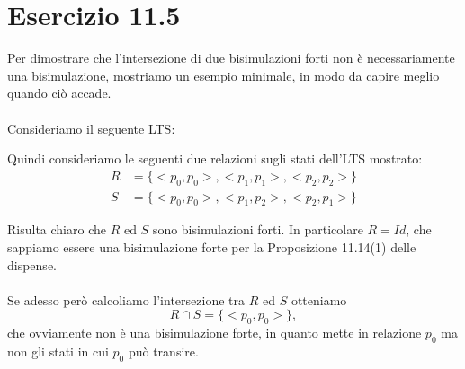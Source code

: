 \section*{Esercizio 11.5}

    
    Per dimostrare che l'intersezione di due bisimulazioni forti non è necessariamente una bisimulazione, mostriamo un esempio minimale, in modo da capire meglio quando ciò accade.\\
    \\
    Consideriamo il seguente LTS:
        
    \begin{center}
    \end{center}
    
    Quindi consideriamo le seguenti due relazioni sugli stati dell'LTS mostrato:
    \begin{align*}
        R &= \{<p_0,p_0>, <p_1,p_1>, <p_2, p_2>\}\\
        S &= \{<p_0,p_0>, <p_1,p_2>, <p_2, p_1>\}
    \end{align*}
    
    Risulta chiaro che $R$ ed $S$ sono bisimulazioni forti. In particolare $R=Id$, che sappiamo essere una bisimulazione forte per la Proposizione 11.14(1) delle dispense.\\
    \\
    Se adesso però calcoliamo l'intersezione tra $R$ ed $S$ otteniamo
    \begin{equation*}
        R \cap S = \{<p_0,p_0>\},
    \end{equation*}
    che ovviamente non è una bisimulazione forte, in quanto mette in relazione $p_0$ ma non gli stati in cui $p_0$ può transire.
